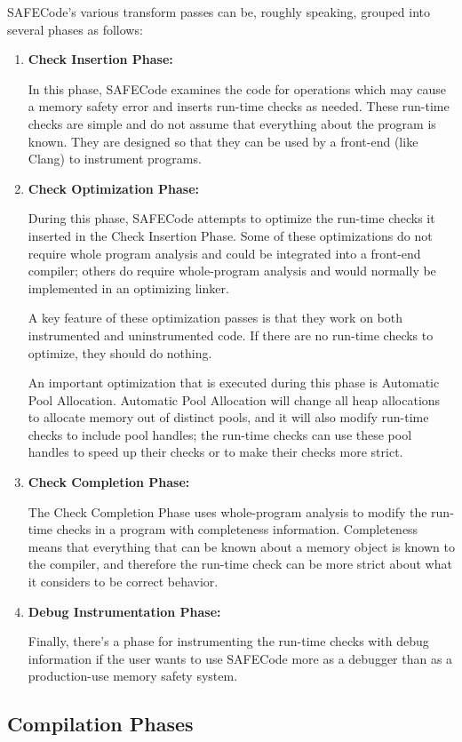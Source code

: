 SAFECode's various transform passes can be, roughly speaking, grouped
into several phases as follows:

\begin{enumerate}
\item{\textbf{Check Insertion Phase:}}

In this phase, SAFECode examines the code for operations which may
cause a memory safety error and inserts run-time checks as needed.
These run-time checks are simple and do not assume that everything
about the program is known.  They are designed so that they can be
used by a front-end (like Clang) to instrument programs.

\item{\textbf{Check Optimization Phase:}}

During this phase, SAFECode attempts to optimize the run-time checks
it inserted in the Check Insertion Phase.  Some of these optimizations
do not require whole program analysis and could be integrated into a
front-end compiler; others do require whole-program analysis and would
normally be implemented in an optimizing linker.

A key feature of these optimization passes is that they work on both
instrumented and uninstrumented code.  If there are no run-time checks
to optimize, they should do nothing.

An important optimization that is executed during this phase is
Automatic Pool Allocation.  Automatic Pool Allocation will change all
heap allocations to allocate memory out of distinct pools, and it will
also modify run-time checks to include pool handles; the run-time
checks can use these pool handles to speed up their checks or to make
their checks more strict.

\item{\textbf{Check Completion Phase:}}

The Check Completion Phase uses whole-program analysis to modify the run-time
checks in a program with completeness information.  Completeness means
that everything that can be known about a memory object is known to
the compiler, and therefore the run-time check can be more strict
about what it considers to be correct behavior.

\item{\textbf{Debug Instrumentation Phase:}}

Finally, there's a phase for instrumenting the run-time checks with
debug information if the user wants to use SAFECode more as a debugger
than as a production-use memory safety system.
\end{enumerate}

\subsection{Compilation Phases}
\label{section:struct:phases}

